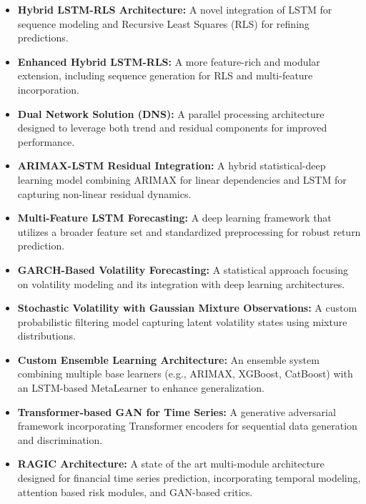 \begin{itemize}
    \item \textbf{Hybrid LSTM-RLS Architecture:} A novel integration of LSTM for sequence modeling and Recursive Least Squares (RLS) for refining predictions.
    
    \item \textbf{Enhanced Hybrid LSTM-RLS:} A more feature-rich and modular extension, including sequence generation for RLS and multi-feature incorporation.
    
    \item \textbf{Dual Network Solution (DNS):} A parallel processing architecture designed to leverage both trend and residual components for improved performance.
    
    \item \textbf{ARIMAX-LSTM Residual Integration:} A hybrid statistical-deep learning model combining ARIMAX for linear dependencies and LSTM for capturing non-linear residual dynamics.
    
    \item \textbf{Multi-Feature LSTM Forecasting:} A deep learning framework that utilizes a broader feature set and standardized preprocessing for robust return prediction.
    
    \item \textbf{GARCH-Based Volatility Forecasting:} A statistical approach focusing on volatility modeling and its integration with deep learning architectures.
    
    \item \textbf{Stochastic Volatility with Gaussian Mixture Observations:} A custom probabilistic filtering model capturing latent volatility states using mixture distributions.
    
    \item \textbf{Custom Ensemble Learning Architecture:} An ensemble system combining multiple base learners (e.g., ARIMAX, XGBoost, CatBoost) with an LSTM-based MetaLearner to enhance generalization.
    
    \item \textbf{Transformer-based GAN for Time Series:} A generative adversarial framework incorporating Transformer encoders for sequential data generation and discrimination.
    
    \item \textbf{RAGIC Architecture:} A state of the art multi-module architecture designed for financial time series prediction, incorporating temporal modeling, attention based risk modules, and GAN-based critics.
\end{itemize}

